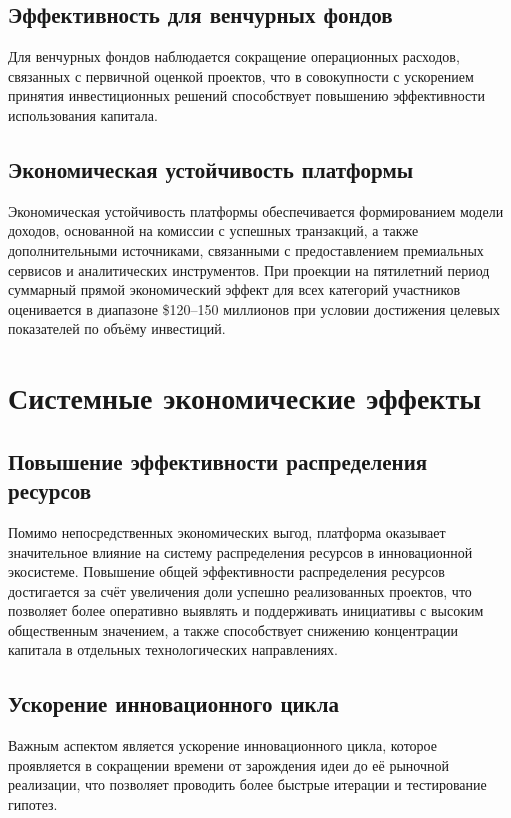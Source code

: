 \documentclass[
    candidate, %
    subf, %
    dotsinheaders=false,
]{disser}
\begin{document}
\subsection{Эффективность для венчурных фондов}
Для венчурных фондов наблюдается сокращение операционных расходов, связанных с первичной оценкой проектов, что в совокупности с ускорением принятия инвестиционных решений способствует повышению эффективности использования капитала.

\subsection{Экономическая устойчивость платформы}
Экономическая устойчивость платформы обеспечивается формированием модели доходов, основанной на комиссии с успешных транзакций, а также дополнительными источниками, связанными с предоставлением премиальных сервисов и аналитических инструментов. При проекции на пятилетний период суммарный прямой экономический эффект для всех категорий участников оценивается в диапазоне \$120–150 миллионов при условии достижения целевых показателей по объёму инвестиций.

\section{Системные экономические эффекты}

\subsection{Повышение эффективности распределения ресурсов}
Помимо непосредственных экономических выгод, платформа оказывает значительное влияние на систему распределения ресурсов в инновационной экосистеме. Повышение общей эффективности распределения ресурсов достигается за счёт увеличения доли успешно реализованных проектов, что позволяет более оперативно выявлять и поддерживать инициативы с высоким общественным значением, а также способствует снижению концентрации капитала в отдельных технологических направлениях.

\subsection{Ускорение инновационного цикла}
Важным аспектом является ускорение инновационного цикла, которое проявляется в сокращении времени от зарождения идеи до её рыночной реализации, что позволяет проводить более быстрые итерации и тестирование гипотез.
\end{document}
